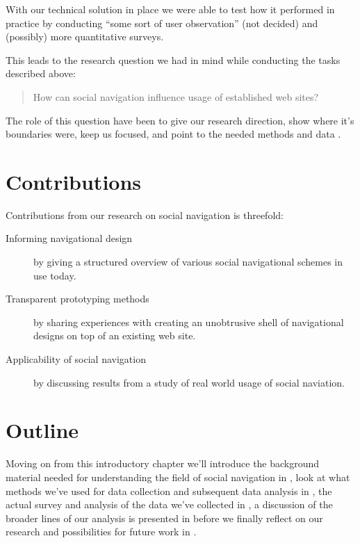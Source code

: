 With our technical solution in place we were able to test how it performed in
practice by conducting ``some sort of user observation'' (not decided) and
(possibly) more quantitative surveys.

This leads to the research question we had in mind while conducting
the tasks described above:

\begin{quote}
  How can social navigation influence usage of established web sites?
\end{quote}

The role of this question have been to give our research direction, show where
it's boundaries were, keep us focused, and point to the needed methods and
data \citep[p.~77]{silverman05}.


\section{Contributions}

Contributions from our research on social navigation is threefold:

\begin{description}
  \item[Informing navigational design] by giving a structured overview of
    various social navigational schemes in use today.
  \item[Transparent prototyping methods] by sharing experiences with
    creating an unobtrusive shell of navigational designs on top of an
    existing web site.
  \item[Applicability of social navigation] by discussing results from
    a study of real world usage of social naviation.
\end{description}

\section{Outline}

Moving on from this introductory chapter we'll introduce the background
material needed for understanding the field of social
navigation in , look at what methods we've
used for data collection and subsequent data analysis in
, the actual survey and analysis of the data
we've collected in , a discussion of the
broader lines of our analysis is presented in 
before we finally reflect on our research and possibilities for future work
in .
